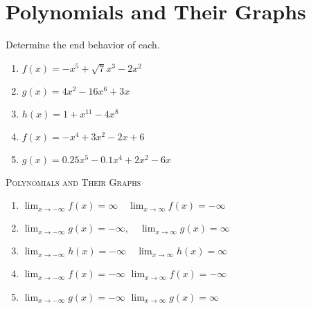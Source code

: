 \chapter{Polynomials and Their Graphs}
\everymath{\displaystyle}

Determine the end behavior of each.
\begin{enumerate}
\item $f(x) = -x^5 + \sqrt{7}x^3 - 2x^2$
\item $g(x) = 4x^2 - 16x^6 + 3x$
\item $h(x) = 1 + x^{11} - 4x^8$
\item $f(x) = -x^4+3x^2-2x+6$
\item $g(x) = 0.25x^5-0.1x^4+2x^2-6x$
\end{enumerate}

\newpage

\textsc{Polynomials and Their Graphs}

\begin{enumerate}
	\item $\lim_{x \to -\infty} f(x) = \infty \quad \lim_{x \to \infty}f(x) = -\infty$
	\item $\lim_{x \to -\infty} g(x) = -\infty, \quad \lim_{x \to \infty}g(x) = \infty$
	\item $\lim_{x \to -\infty} h(x) = -\infty \quad \lim_{x \to \infty}h(x) =\infty$
	\item $\lim_{x \to -\infty}f(x) = -\infty$ \quad $\lim_{x \to \infty}f(x) = -\infty$
    \item $\lim_{x \to -\infty}g(x) = -\infty$ \quad $\lim_{x \to \infty}g(x) = \infty$
\end{enumerate}
